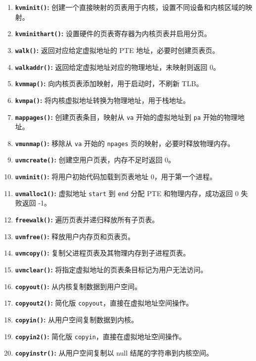 \documentclass[UTF8]{article}
\begin{document}
\begin{enumerate}[label=\textbf{\arabic*}., wide, labelwidth=!, labelindent=0pt]
  \item \textbf{\texttt{kvminit()}:} 创建一个直接映射的页表用于内核，设置不同设备和内核区域的映射。
  \item \textbf{\texttt{kvminithart()}:} 设置硬件的页表寄存器为内核页表并启用分页。
  \item \textbf{\texttt{walk()}:} 返回对应给定虚拟地址的 PTE 地址，必要时创建页表页。
  \item \textbf{\texttt{walkaddr()}:} 返回给定虚拟地址对应的物理地址，未映射则返回 0。
  \item \textbf{\texttt{kvmmap()}:} 向内核页表添加映射，用于启动时，不刷新 TLB。
  \item \textbf{\texttt{kvmpa()}:} 将内核虚拟地址转换为物理地址，用于栈地址。
  \item \textbf{\texttt{mappages()}:} 创建页表条目，映射从 \texttt{va} 开始的虚拟地址到 \texttt{pa} 开始的物理地址。
  \item \textbf{\texttt{vmunmap()}:} 移除从 \texttt{va} 开始的 \texttt{npages} 页的映射，必要时释放物理内存。
  \item \textbf{\texttt{uvmcreate()}:} 创建空用户页表，内存不足时返回 0。
  \item \textbf{\texttt{uvminit()}:} 将用户初始代码加载到页表地址 0，用于第一个进程。
  \item \textbf{\texttt{uvmalloc1()}:} 虚拟地址 \texttt{start} 到 \texttt{end} 分配 PTE 和物理内存，成功返回 0 失败返回 -1。
  \item \textbf{\texttt{freewalk()}:} 遍历页表并递归释放所有子页表。
  \item \textbf{\texttt{uvmfree()}:} 释放用户内存页和页表页。
  \item \textbf{\texttt{uvmcopy()}:} 复制父进程页表及其物理内存到子进程页表。
  \item \textbf{\texttt{uvmclear()}:} 将指定虚拟地址的页表条目标记为用户无法访问。
  \item \textbf{\texttt{copyout()}:} 从内核复制数据到用户空间。
  \item \textbf{\texttt{copyout2()}:} 简化版 \texttt{copyout}，直接在虚拟地址空间操作。
  \item \textbf{\texttt{copyin()}:} 从用户空间复制数据到内核。
  \item \textbf{\texttt{copyin2()}:} 简化版 \texttt{copyin}，直接在虚拟地址空间操作。
  \item \textbf{\texttt{copyinstr()}:} 从用户空间复制以 null 结尾的字符串到内核空间。

\end{enumerate}
\end{document}
